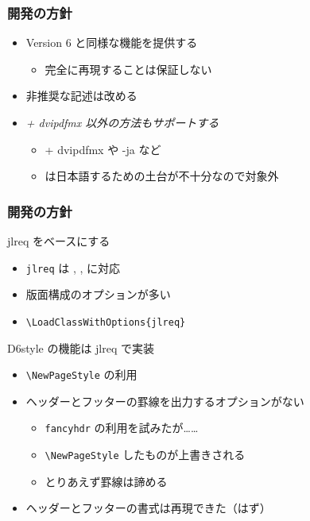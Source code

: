 \documentclass[unicode,12pt,colorlinks,]{beamer}
\begin{document}
\begin{frame}
	\frametitle{開発の方針}
	\begin{itemize}
		\item Version 6 と同様な機能を提供する
			\begin{itemize}
				\item 完全に再現することは保証しない
			\end{itemize}
		\item 非推奨な記述は改める
		\item \emph{\pLaTeX + dvipdfmx 以外の方法もサポートする}
			\begin{itemize}
				\item \upLaTeX + dvipdfmx や \LuaLaTeX-ja など
				\item \XeLaTeX は日本語するための土台が不十分なので対象外
			\end{itemize}
	\end{itemize}
\end{frame}

\begin{frame}[fragile]
	\frametitle{開発の方針}
	\begin{block}{jlreq をベースにする}
		\begin{itemize}
			\item \texttt{jlreq} は \pLaTeX, \upLaTeX, \LuaLaTeX に対応
			\item 版面構成のオプションが多い
			\item \verb|\LoadClassWithOptions{jlreq}|
		\end{itemize}
	\end{block}

	\begin{block}{D6style の機能は jlreq で実装}
		\begin{itemize}
			\item \verb|\NewPageStyle| の利用
			\item ヘッダーとフッターの罫線を出力するオプションがない
				\begin{itemize}
					\item \texttt{fancyhdr} の利用を試みたが……
					\item \verb|\NewPageStyle| したものが上書きされる
					\item とりあえず罫線は諦める
				\end{itemize}
			\item ヘッダーとフッターの書式は再現できた（はず）
		\end{itemize}
	\end{block}
\end{frame}
\end{document}

